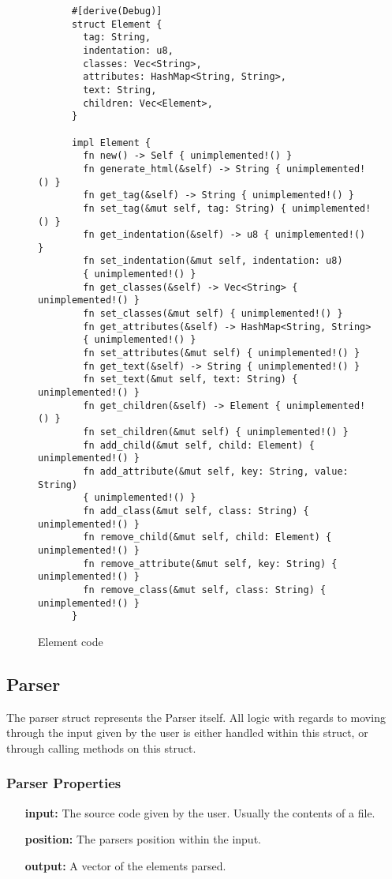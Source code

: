 \begin{figure}[ht!]
    \small
    \begin{verbatim}
      #[derive(Debug)]
      struct Element {
        tag: String,
        indentation: u8,
        classes: Vec<String>,
        attributes: HashMap<String, String>,
        text: String,
        children: Vec<Element>,
      }

      impl Element {
        fn new() -> Self { unimplemented!() }
        fn generate_html(&self) -> String { unimplemented!() }
        fn get_tag(&self) -> String { unimplemented!() }
        fn set_tag(&mut self, tag: String) { unimplemented!() }
        fn get_indentation(&self) -> u8 { unimplemented!() }
        fn set_indentation(&mut self, indentation: u8) 
        { unimplemented!() }
        fn get_classes(&self) -> Vec<String> { unimplemented!() }
        fn set_classes(&mut self) { unimplemented!() }
        fn get_attributes(&self) -> HashMap<String, String> 
        { unimplemented!() }
        fn set_attributes(&mut self) { unimplemented!() }
        fn get_text(&self) -> String { unimplemented!() }
        fn set_text(&mut self, text: String) { unimplemented!() }
        fn get_children(&self) -> Element { unimplemented!() }
        fn set_children(&mut self) { unimplemented!() }
        fn add_child(&mut self, child: Element) { unimplemented!() }
        fn add_attribute(&mut self, key: String, value: String) 
        { unimplemented!() }
        fn add_class(&mut self, class: String) { unimplemented!() }
        fn remove_child(&mut self, child: Element) { unimplemented!() }
        fn remove_attribute(&mut self, key: String) { unimplemented!() }
        fn remove_class(&mut self, class: String) { unimplemented!() }
      }
    \end{verbatim}
    \caption{Element code}
\end{figure}

\subsection{Parser}
The parser struct represents the Parser itself. All logic with regards to moving through the input given by the user is either handled within this struct, or through calling methods on this struct.

\subsubsection{Parser Properties}
\begin{itemize}
    \item[\textbf{input:}] The source code given by the user. Usually the contents of a file.
    \item[\textbf{position:}] The parsers position within the input. 
    \item[\textbf{output:}] A vector of the elements parsed.
\end{itemize}

